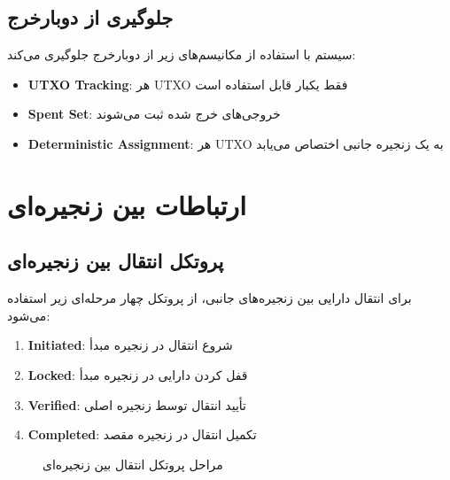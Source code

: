 \subsection{جلوگیری از دوبار‌خرج }

سیستم با استفاده از مکانیسم‌های زیر از دوبار‌خرج جلوگیری می‌کند:

\begin{itemize}
    \item \textbf{UTXO Tracking}: هر UTXO فقط یکبار قابل استفاده است
    \item \textbf{Spent Set}: خروجی‌های خرج شده ثبت می‌شوند
    \item \textbf{Deterministic Assignment}: هر UTXO به یک زنجیره جانبی اختصاص می‌یابد
\end{itemize}

\section{ارتباطات بین زنجیره‌ای }

\subsection{پروتکل انتقال بین زنجیره‌ای}

برای انتقال دارایی بین زنجیره‌های جانبی، از پروتکل چهار مرحله‌ای زیر استفاده می‌شود:

\begin{enumerate}
    \item \textbf{Initiated}: شروع انتقال در زنجیره مبدأ
    \item \textbf{Locked}: قفل کردن دارایی در زنجیره مبدأ
    \item \textbf{Verified}: تأیید انتقال توسط زنجیره اصلی
    \item \textbf{Completed}: تکمیل انتقال در زنجیره مقصد
\end{enumerate}

\begin{figure}[h]
\centering
\begin{latin}
\end{latin}
\caption{مراحل پروتکل انتقال بین زنجیره‌ای}
\end{figure}

